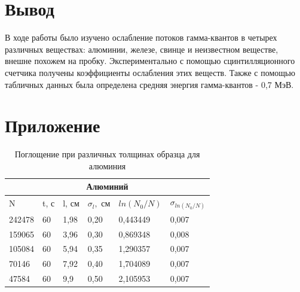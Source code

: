 \documentclass[a4paper,12pt]{article} %
\begin{document}
\section{Вывод}

В ходе работы было изучено ослабление потоков гамма-квантов в четырех различных веществах: алюминии, железе, свинце и неизвестном веществе, внешне похожем на пробку. Экспериментально с помощью сцинтилляционного счетчика получены коэффициенты ослабления этих веществ. Также с помощью табличных данных была определена средняя энергия гамма-квантов - 0,7 МэВ.

\newpage

\section{Приложение}

\begin{table}[h!]

\begin{center}

\begin{tabular}{|llllll|}
\hline
\multicolumn{6}{|c|}{Алюминий}                                                                                                                                               \\ \hline
\multicolumn{1}{|l|}{N}      & \multicolumn{1}{l|}{t, с} & \multicolumn{1}{l|}{l, см} & \multicolumn{1}{l|}{$\sigma_l,$ см} & \multicolumn{1}{l|}{$ln(N_0/N)$} & $\sigma_{ln(N_0/N)}$ \\ \hline
\multicolumn{1}{|l|}{242478} & \multicolumn{1}{l|}{60}   & \multicolumn{1}{l|}{1,98}  & \multicolumn{1}{l|}{0,20}           & \multicolumn{1}{l|}{0,443449}    & 0,007       \\ \hline
\multicolumn{1}{|l|}{159065} & \multicolumn{1}{l|}{60}   & \multicolumn{1}{l|}{3,96}  & \multicolumn{1}{l|}{0,30}           & \multicolumn{1}{l|}{0,869348}    & 0,008       \\ \hline
\multicolumn{1}{|l|}{105084} & \multicolumn{1}{l|}{60}   & \multicolumn{1}{l|}{5,94}  & \multicolumn{1}{l|}{0,35}           & \multicolumn{1}{l|}{1,290357}    & 0,007       \\ \hline
\multicolumn{1}{|l|}{70146}  & \multicolumn{1}{l|}{60}   & \multicolumn{1}{l|}{7,92}  & \multicolumn{1}{l|}{0,40}           & \multicolumn{1}{l|}{1,704089}    & 0,007       \\ \hline
\multicolumn{1}{|l|}{47584}  & \multicolumn{1}{l|}{60}   & \multicolumn{1}{l|}{9,9}   & \multicolumn{1}{l|}{0,50}           & \multicolumn{1}{l|}{2,105953}    & 0,007       \\ \hline
\end{tabular}

\end{center} 

\caption{Поглощение при различных толщинах образца для алюминия}
\end{table}
\end{document}
